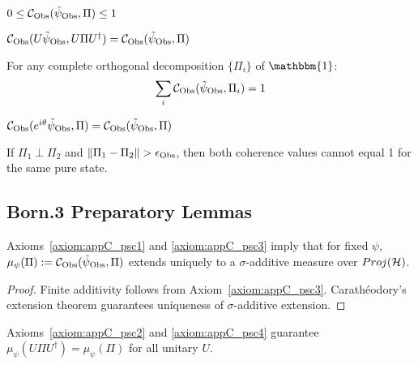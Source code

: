 \begin{axiom}[PS--C1 (Boundedness)]
\label{axiom:appC_psc1}
$0 \leq \mathcal{C}_{\mathrm{Obs}}(\tilde\psi_{\mathrm{Obs}}, \Pi) \leq 1$
\end{axiom}

\begin{axiom}
\label{axiom:appC_psc2}
$\mathcal{C}_{\mathrm{Obs}}(U \tilde\psi_{\mathrm{Obs}}, U \Pi U^\dagger)
= \mathcal{C}_{\mathrm{Obs}}(\tilde\psi_{\mathrm{Obs}}, \Pi)$
\end{axiom}

\begin{axiom}
\label{axiom:appC_psc3}
For any complete orthogonal decomposition $\{\Pi_i\}$ of $\mathbbm{1}$:
\[
\sum_i \mathcal{C}_{\mathrm{Obs}}(\tilde\psi_{\mathrm{Obs}}, \Pi_i) = 1
\]
\end{axiom}

\begin{axiom}
\label{axiom:appC_psc4}
$\mathcal{C}_{\mathrm{Obs}}(e^{i\theta} \tilde\psi_{\mathrm{Obs}}, \Pi)
= \mathcal{C}_{\mathrm{Obs}}(\tilde\psi_{\mathrm{Obs}}, \Pi)$
\end{axiom}

\begin{axiom}
\label{axiom:appC_psc5}
If $\Pi_1 \perp \Pi_2$ and $\| \Pi_1 - \Pi_2 \| > \epsilon_{\mathrm{Obs}}$,
then both coherence values cannot equal 1 for the same pure state.
\end{axiom}

\subsection{Born.3 Preparatory Lemmas}
\label{subsec:appC_born_lemmas}

\begin{lemma}
\label{lemma:appC_sigma_additivity}
Axioms~\ref{axiom:appC_psc1} and \ref{axiom:appC_psc3}
imply that for fixed $\psi$,
$\mu_\psi(\Pi) := \mathcal{C}_{\mathrm{Obs}}(\tilde\psi_{\mathrm{Obs}}, \Pi)$
extends uniquely to a $\sigma$-additive measure over $Proj(\mathcal{H})$.
\end{lemma}

\begin{proof}
Finite additivity follows from Axiom~\ref{axiom:appC_psc3}.
Carathéodory’s extension theorem guarantees uniqueness of $\sigma$-additive extension.
\end{proof}

\begin{lemma}
\label{lemma:appC_unitary_invariance}
Axioms~\ref{axiom:appC_psc2} and \ref{axiom:appC_psc4}
guarantee $\mu_\psi(U \Pi U^\dagger) = \mu_\psi(\Pi)$ for all unitary $U$.
\end{lemma}

